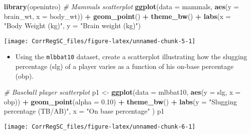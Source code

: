 \documentclass[
]{book}
\newenvironment{Shaded}{\begin{snugshade}}{\end{snugshade}}
\newcommand{\CommentTok}[1]{\textcolor[rgb]{0.56,0.35,0.01}{\textit{#1}}}
\newcommand{\DataTypeTok}[1]{\textcolor[rgb]{0.13,0.29,0.53}{#1}}
\newcommand{\FloatTok}[1]{\textcolor[rgb]{0.00,0.00,0.81}{#1}}
\newcommand{\KeywordTok}[1]{\textcolor[rgb]{0.13,0.29,0.53}{\textbf{#1}}}
\newcommand{\NormalTok}[1]{#1}
\newcommand{\OperatorTok}[1]{\textcolor[rgb]{0.81,0.36,0.00}{\textbf{#1}}}
\newcommand{\StringTok}[1]{\textcolor[rgb]{0.31,0.60,0.02}{#1}}
\providecommand{\tightlist}{%
  \setlength{\itemsep}{0pt}\setlength{\parskip}{0pt}}
\begin{document}
\begin{Shaded}
\begin{Highlighting}[]
\KeywordTok{library}\NormalTok{(openintro)}
\CommentTok{# Mammals scatterplot}
\KeywordTok{ggplot}\NormalTok{(}\DataTypeTok{data =}\NormalTok{ mammals, }\KeywordTok{aes}\NormalTok{(}\DataTypeTok{y =}\NormalTok{ brain_wt, }\DataTypeTok{x =}\NormalTok{ body_wt)) }\OperatorTok{+}
\StringTok{  }\KeywordTok{geom_point}\NormalTok{() }\OperatorTok{+}\StringTok{ }
\StringTok{  }\KeywordTok{theme_bw}\NormalTok{() }\OperatorTok{+}\StringTok{ }
\StringTok{  }\KeywordTok{labs}\NormalTok{(}\DataTypeTok{x =} \StringTok{"Body Weight (kg)"}\NormalTok{, }\DataTypeTok{y =} \StringTok{"Brain weight (kg)"}\NormalTok{)}
\end{Highlighting}
\end{Shaded}

\begin{center}\texttt{[image: CorrRegSC\_files/figure-latex/unnamed-chunk-5-1]} \end{center}

\begin{itemize}
\tightlist
\item
  Using the \texttt{mlbbat10} dataset, create a scatterplot illustrating how the slugging percentage (slg) of a player varies as a function of his on-base percentage (obp).
\end{itemize}

\begin{Shaded}
\begin{Highlighting}[]
\CommentTok{# Baseball player scatterplot}
\NormalTok{p1 <-}\StringTok{ }\KeywordTok{ggplot}\NormalTok{(}\DataTypeTok{data =}\NormalTok{ mlbbat10, }\KeywordTok{aes}\NormalTok{(}\DataTypeTok{y =}\NormalTok{ slg, }\DataTypeTok{x =}\NormalTok{ obp)) }\OperatorTok{+}
\StringTok{  }\KeywordTok{geom_point}\NormalTok{(}\DataTypeTok{alpha =} \FloatTok{0.10}\NormalTok{) }\OperatorTok{+}\StringTok{ }
\StringTok{  }\KeywordTok{theme_bw}\NormalTok{() }\OperatorTok{+}\StringTok{ }
\StringTok{  }\KeywordTok{labs}\NormalTok{(}\DataTypeTok{y =} \StringTok{"Slugging percentage (TB/AB)"}\NormalTok{, }\DataTypeTok{x =} \StringTok{"On base percentage"}\NormalTok{ )}
\NormalTok{p1}
\end{Highlighting}
\end{Shaded}

\begin{center}\texttt{[image: CorrRegSC\_files/figure-latex/unnamed-chunk-6-1]} \end{center}
\end{document}
